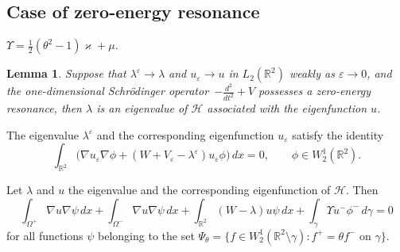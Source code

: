 \documentclass[reqno]{amsart}
\theoremstyle{plain}
\newtheorem{lem}{Lemma}
\numberwithin{equation}{section}
\renewcommand{\kappa}{\varkappa}
\newcommand{\Real}{\mathbb R}
\newcommand{\eps}{\varepsilon}
\newcommand{\cH}{\mathcal{H}}
\begin{document}
\subsection{Case of zero-energy resonance}


$\Upsilon=\tfrac12(\theta^2-1)\kappa+\mu$.

\begin{lem}\label{lemConvD}
  Suppose that $\lambda^\eps\to \lambda$ and $u_\eps\to u$ in $L_2(\Real^2)$ weakly as $\eps\to 0$, and   the one-dimensional Schr\"odinger operator~$-\frac{d^2}{d t^2}+V$  possesses a zero-energy resonance, then $\lambda$ is an eigenvalue of $\cH$ associated with the eigenfunction $u$.
\end{lem}






The eigenvalue $\lambda^\eps$ and the corresponding eigenfunction $u_\eps$ satisfy the identity
\begin{equation*}
   \int_{\Real^2}\big(\nabla u_\eps \nabla \phi+
              (W+V_\eps-\lambda^\eps)u_\eps \phi\big)\,dx=0, \qquad \phi\in W_2^1(\Real^2).
\end{equation*}


Let $\lambda$ and $u$ the eigenvalue and the corresponding eigenfunction of
 $\cH$. Then
\begin{equation*}
   \int_{\Omega^+}\nabla u \nabla \psi\,dx+\int_{\Omega^-}\nabla u \nabla \psi\,dx
   +\int_{\Real^2}(W-\lambda)u\psi\,dx
   +\int_\gamma \Upsilon u^-\phi^-\,d\gamma=0
\end{equation*}
for all functions $\psi$ belonging to the set $\Psi_\theta=\{f\in W_2^1(\Real^2\setminus \gamma)\colon f^+=\theta f^- \text{ on }\gamma\}$.
\end{document}
